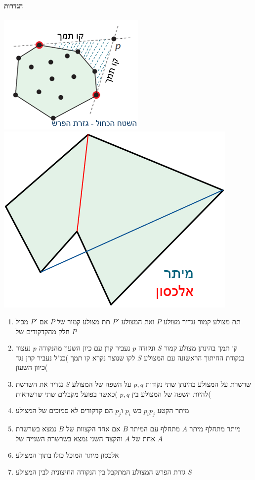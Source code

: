 \documentclass{article}
\makeatletter
\newcommand*{\saved@uline}{}
\let\saved@uline\uline
\newcommand*{\mathuline}{%
  \mathpalette{\math@uline\saved@uline}%
}
\newcommand*{\math@uline}[3]{%
  \mbox{#1{$#2#3\m@th$}}%
}
\renewcommand*{\uline}{%
  \relax  
  \ifmmode
    \expandafter\mathuline
  \else
    \expandafter\saved@uline
  \fi
}
\makeatother
\begin{document}
\paragraph{הגדרות}
\includegraphics[scale=0.7]{z6.png}
\includegraphics[scale=0.4]{z7.png}
\\
\begin{enumerate}
\item \uline{תת מצולע קמור} נגדיר מצולע $P$ ואת המצולע $P'$ תת מצולע קמור של $P$ אם $P'$ מכיל חלק מהקדקודים של $P$
\item \uline{קו תמך} בהינתן מצולע קמור $S$ ונקודה $p$ נעביר קרן עם כיון השעון מהנקודה $p$ נעצור בנקודת החיתוך הראשונה עם המצולע $S$ לקו שנוצר נקרא קו תמך )כנ"ל נעביר קרן נגד כיוון השעון(
\item \uline{שרשרת על המצולע} בהינתן שתי נקודות $p,q$ על השפה של המצולע $S$ נגדיר את השרשת להיות השפה של המצולע בין $p,q$ )כאשר בפועל מקבלים שתי שרשראות(
\item \uline{מיתר} הקטע  $p_ip_j$ כש $p_i$ ו$p_j$ הם קדקודים לא סמוכים של המצולע
\item \uline{מיתר מתחלף} מיתר $A$ מתחלף עם המיתר $B$ אם אחד הקצוות של $B$ נמצא בשרשרת אחת של $A$ והקצה השני נמצא בשרשרת השנייה של $A$
\item \uline{אלכסון} מיתר המוכל כולו בתוך המצולע
\item \uline{גזרת הפרש} המצולע המתקבל בין הנקודה החיצונית לבין המצולע $S$ 
\end{enumerate}
\end{document}
